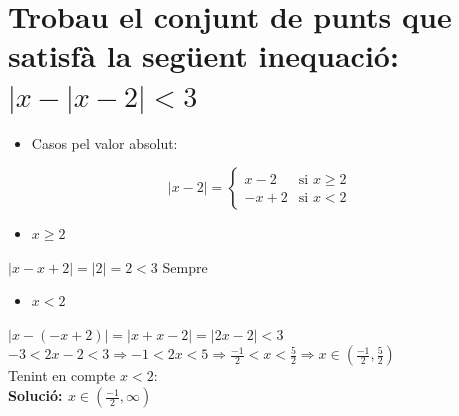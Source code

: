 \section{\texorpdfstring{ Trobau el conjunt de punts que satisfà la següent inequació: $|x - |x - 2| < 3$}{|x - |x - 2| < 3}}

\begin{itemize}
    \item Casos pel valor absolut:
\end{itemize}

\[
|x - 2| =
\begin{cases}
x - 2 & \text{si } x \geq 2 \\
-x + 2 & \text{si } x < 2
\end{cases}
\]

\begin{itemize}
    \item $x \geq 2$
\end{itemize}
$|x-x+2| = |2| = 2 < 3$ Sempre

\begin{itemize}
    \item $x < 2$
\end{itemize}

$|x-(-x+2)| = |x+x-2| = |2x-2| < 3$ \\
$-3<2x-2<3 \Rightarrow -1 <2x<5 \Rightarrow \frac{-1}{2} < x < \frac{5}{2} \Rightarrow x \in (\frac{-1}{2}, \frac{5}{2})$ \\
Tenint en compte $x<2$: \\


\textbf{Solució: $x \in (\frac{-1}{2}, \infty)$}